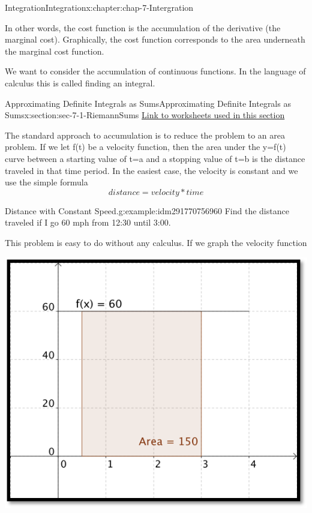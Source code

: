 \documentclass[oneside,10pt,]{book}
\numberwithin{equation}{section}
\begin{document}
\begin{chapterptx}{Integration}{}{Integration}{}{}{x:chapter:chap-7-Intergration}
\begin{introduction}{}
\begin{sidebyside}{1}{0.2}{0.2}{0}
\begin{sbspanel}{0.6}
\end{sbspanel}%
\end{sidebyside}%
\par
In other words, the cost function is the accumulation of the derivative (the marginal cost). Graphically, the cost function corresponds to the area underneath the marginal cost function.%
\par
We want to consider the accumulation of continuous functions.  In the language of calculus this is called finding an integral.%
\end{introduction}%
%
%
\typeout{************************************************}
\typeout{************************************************}
%
\begin{sectionptx}{Approximating Definite Integrals as Sums}{}{Approximating Definite Integrals as Sums}{}{}{x:section:sec-7-1-RiemannSums}
\href{./Examples/Section-7-1-Examples.xlsx}{Link to worksheets used in this section}%
\par
The standard approach to accumulation is to reduce the problem to an area problem.  If we let f(t) be a velocity function, then the area under the y=f(t) curve between a starting value of t=a and a stopping value of t=b is the distance traveled in that time period.  In the easiest case, the velocity is constant and we use the simple formula%
%
\begin{equation*}
distance = velocity * time 
\end{equation*}
\begin{example}{Distance with Constant Speed.}{g:example:idm291770756960}%
Find the distance traveled if I go 60 mph from 12:30 until 3:00.%
\par
This problem is easy to do without any calculus.  If we graph the velocity function%
\begin{sidebyside}{1}{0.2}{0.2}{0}%
\begin{sbspanel}{0.6}%
\includegraphics[width=\linewidth]{images/sec7-1-1.png}

\end{sbspanel}
\end{sidebyside}
\end{example}
\end{sectionptx}
\end{chapterptx}
\end{document}
